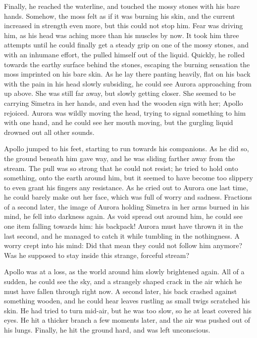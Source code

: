 Finally, he reached the waterline, and touched the mossy stones with his bare hands. Somehow, the moss felt as if it was burning his skin, and the current increased in strength even more, but this could not stop him. Fear was driving him, as his head was aching more than his muscles by now. It took him three attempts until he could finally get a steady grip on one of the mossy stones, and with an inhumane effort, the pulled himself out of the liquid. Quickly, he rolled towards the earthy surface behind the stones, escaping the burning sensation the moss imprinted on his bare skin. As he lay there panting heavily, flat on his back with the pain in his head slowly subsiding, he could see Aurora approaching from up above. She was still far away, but slowly getting closer. She seemed to be carrying Simetra in her hands, and even had the wooden sign with her; Apollo rejoiced. Aurora was wildly moving the head, trying to signal something to him with one hand, and he could see her mouth moving, but the gurgling liquid drowned out all other sounds.

Apollo jumped to his feet, starting to run towards his companions. As he did so, the ground beneath him gave way, and he was sliding farther away from the stream. The pull was so strong that he could not resist; he tried to hold onto something, onto the earth around him, but it seemed to have become too slippery to even grant his fingers any resistance. As he cried out to Aurora one last time, he could barely make out her face, which was full of worry and sadness. Fractions of a second later, the image of Aurora holding Simetra in her arms burned in his mind, he fell into darkness again. As void spread out around him, he could see one item falling towards him: his backpack! Aurora must have thrown it in the last second, and he managed to catch it while tumbling in the nothingness. A worry crept into his mind: Did that mean they could not follow him anymore? Was he supposed to stay inside this strange, forceful stream?

Apollo was at a loss, as the world around him slowly brightened again. All of a sudden, he could see the sky, and a strangely shaped crack in the air which he must have fallen through right now. A second later, his back crashed against something wooden, and he could hear leaves rustling as small twigs scratched his skin. He had tried to turn mid-air, but he was too slow, so he at least covered his eyes. He hit a thicker branch a few moments later, and the air was pushed out of his lungs. Finally, he hit the ground hard, and was left unconscious.
